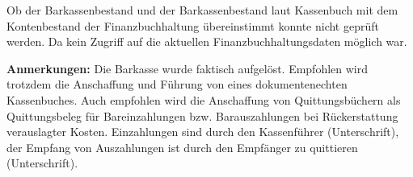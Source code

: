 \documentclass[%
	titlepage,oneside,12pt,headlines=1.5,numbers=noenddot, chapterprefix=false,parskip=full-,DIV=14,pagesize]{scrreprt}
\begin{document}
Ob der Barkassenbestand und der Barkassenbestand laut Kassenbuch mit dem Kontenbestand der Finanzbuchhaltung übereinstimmt konnte nicht geprüft werden. Da kein Zugriff auf die aktuellen Finanzbuchhaltungsdaten möglich war.





\textbf{Anmerkungen:}
Die Barkasse wurde faktisch aufgelöst. Empfohlen wird trotzdem die Anschaffung und Führung von eines dokumentenechten Kassenbuches. Auch empfohlen wird die Anschaffung von Quittungsbüchern als Quittungsbeleg für Bareinzahlungen bzw. Barauszahlungen bei Rückerstattung verauslagter Kosten. Einzahlungen sind durch den Kassenführer (Unterschrift), der Empfang von Auszahlungen ist durch den Empfänger zu quittieren (Unterschrift).
\end{document}
